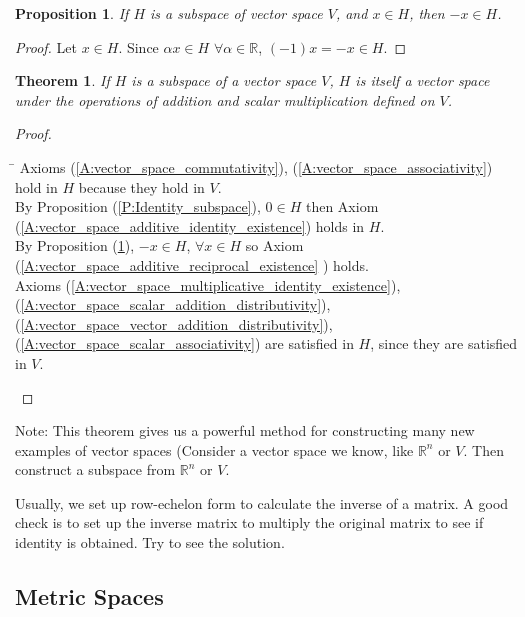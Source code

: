 \documentclass[twoside]{amsart}
\theoremstyle{plain}
\newtheorem{theorem}{Theorem}
\newtheorem{proposition}{Proposition}
\theoremstyle{definition}
\begin{document}
\begin{proposition}\label{P:Additive_Reciprocal_subspace}
If $H$ is a subspace of vector space $V$, and $x \in H$, then $-x \in H$.  
\end{proposition}
\begin{proof}
Let $x \in H$.  Since $\alpha x \in H$ \quad $\forall \alpha \in \mathbb{R} $, \quad $ (-1)x = -x \in H $.  
\end{proof}

\begin{theorem}
If $H$ is a subspace of a vector space $V$, $H$ is itself a vector space under the operations of addition and scalar multiplication defined on $V$. 
\end{theorem}
\begin{proof} \quad \medskip 
\begin{tabbing}
  \hspace*{1cm}\=\hspace{2ex}\kill
  \> Axioms (\ref{A:vector_space_commutativity}), (\ref{A:vector_space_associativity}) hold in $H$ because they hold in $V$.  \\
  \> By Proposition (\ref{P:Identity_subspace}), $0 \in H$ then Axiom (\ref{A:vector_space_additive_identity_existence}) holds in $H$.  \\
  \> By Proposition (\ref{P:Additive_Reciprocal_subspace}), $-x \in H$, \quad $\forall x \in H $ so Axiom (\ref{A:vector_space_additive_reciprocal_existence} ) holds.  \\
  \> Axioms (\ref{A:vector_space_multiplicative_identity_existence}), (\ref{A:vector_space_scalar_addition_distributivity}), (\ref{A:vector_space_vector_addition_distributivity}), (\ref{A:vector_space_scalar_associativity}) are satisfied in $H$, since they are satisfied in $V$.  
\end{tabbing}
\end{proof}

Note: This theorem gives us a powerful method for constructing many new examples of vector spaces (Consider a vector space we know, like $\mathbb{R}^n$ or $V$.  Then construct a subspace from $\mathbb{R}^n$ or $V$.  

Usually, we set up row-echelon form to calculate the inverse of a matrix.  A good check is to set up the inverse matrix to multiply the original matrix to see if identity is obtained.  Try to see the solution.  

\subsection{Metric Spaces}\label{subS:Metric_Spaces}
\end{document}
